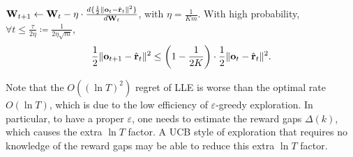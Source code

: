 	\begin{lem}
		\label{lem:logit_l2_loss_parameter_smoothness}
		${\mathbf{W}}_{t+1} \gets {\mathbf{W}}_t - \eta \cdot \frac{d \{ \frac{1}{2} \| {\mathbf{o}}_t - \hat{{\mathbf{r}}}_t \|^2 \}}{d {\mathbf{W}}_t}$, with $\eta = \frac{1}{K m}$. With high probability, $\forall t \le \frac{\tau}{2 \eta} \coloneqq \frac{1}{2 \eta \sqrt{m}}$, 
		\begin{equation*}
		\begin{split}
		\frac{1}{2} \| {\mathbf{o}}_{t+1} - \hat{{\mathbf{r}}}_t \|^2 \le \left( 1 - \frac{1}{2 K} \right) \cdot \frac{1}{2} \| {\mathbf{o}}_t - \hat{{\mathbf{r}}}_t \|^2.
		\end{split}
		\end{equation*}
	\end{lem}
	
\begin{remk}
	Note that the $O((\ln T)^2)$ regret of LLE is worse than the optimal rate $O(\ln T)$, which is due to the low efficiency of $\varepsilon$-greedy exploration.
	In particular, to have a proper $\varepsilon$, one needs to estimate the reward gaps $\Delta(k)$, which causes the extra $\ln T$ factor.
	A UCB style of exploration that requires no knowledge of the reward gaps may be able to reduce this extra $\ln T$ factor.
\end{remk}

